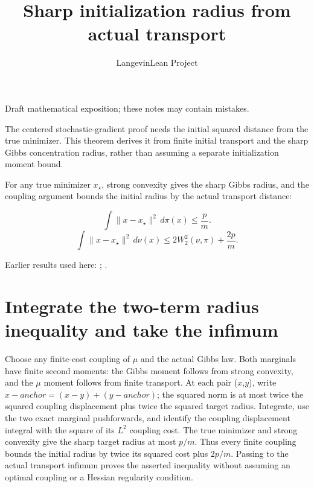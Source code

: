 \documentclass[11pt,a4paper]{article}
\title{\texorpdfstring{Sharp initialization radius from actual transport}{Sharp initialization radius from actual transport}}
\author{LangevinLean Project}
\date{}
\begin{document}
\maketitle
Draft mathematical exposition; these notes may contain mistakes.


The centered stochastic-gradient proof needs the initial squared distance from the true minimizer. This theorem derives it from finite initial transport and the sharp Gibbs concentration radius, rather than assuming a separate initialization moment bound.



For any true minimizer \(x_\star\), strong convexity gives the sharp Gibbs radius, and the coupling argument bounds the initial radius by the actual transport distance:


\[\int\|x-x_\star\|^2\,d\pi(x)\le\frac pm.\]
\[\int\|x-x_\star\|^2\,d\nu(x)\le2W_2^2(\nu,\pi)+\frac{2p}{m}.\]

Earlier results used here: \cite[Section~3.5]{LangevinLean2026Proximal}; \cite[Section~3.32]{LangevinLean2026ULASC}.

\section{\texorpdfstring{Integrate the two-term radius inequality and take the infimum}{Integrate the two-term radius inequality and take the infimum}}


Choose any finite-cost coupling of \(\mu\) and the actual Gibbs law. Both marginals have finite second moments: the Gibbs moment follows from strong convexity, and the \(\mu\) moment follows from finite transport. At each pair (\(x\),\(y\)), write \(x-anchor=(x-y)+(y-anchor)\); the squared norm is at most twice the squared coupling displacement plus twice the squared target radius. Integrate, use the two exact marginal pushforwards, and identify the coupling displacement integral with the square of its \(L^{2}\) coupling cost. The true minimizer and strong convexity give the sharp target radius at most \(p/m\). Thus every finite coupling bounds the initial radius by twice its squared cost plus \(2p/m\). Passing to the actual transport infimum proves the asserted inequality without assuming an optimal coupling or a Hessian regularity condition.
\end{document}
